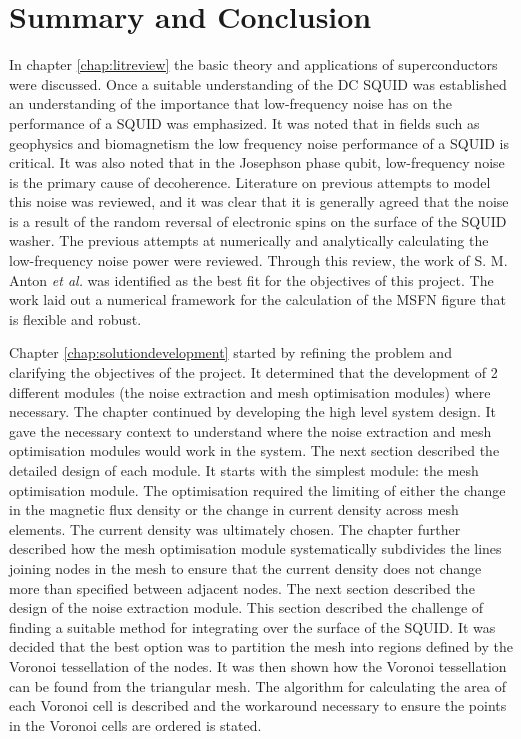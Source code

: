\graphicspath{{conclusion/fig/}}

\chapter{Summary and Conclusion}
\label{chap:conclusion}

In chapter \ref{chap:litreview} the basic theory and applications of superconductors were discussed. Once a suitable understanding of the DC SQUID was established an understanding of the importance that low-frequency noise has on the performance of a SQUID was emphasized. It was noted that in fields such as geophysics and biomagnetism the low frequency noise performance of a SQUID is critical. It was also noted that in the Josephson phase qubit, low-frequency noise is the primary cause of decoherence. Literature on previous attempts to model this noise was reviewed, and it was clear that it is generally agreed that the noise is a result of the random reversal of electronic spins on the surface of the SQUID washer. The previous attempts at numerically and analytically calculating the low-frequency noise power were reviewed. Through this review, the work of S. M. Anton \textit{et al.} was identified as the best fit for the objectives of this project. The work laid out a numerical framework for the calculation of the MSFN figure that is flexible and robust. \par
Chapter \ref{chap:solutiondevelopment} started by refining the problem and clarifying the objectives of the project. It determined that the development of 2 different modules (the noise extraction and mesh optimisation modules) where necessary. The chapter continued by developing the high level system design. It gave the necessary context to understand where the noise extraction and mesh optimisation modules would work in the system. The next section described the detailed design of each module. It starts with the simplest module: the mesh optimisation module. The optimisation required the limiting of either the change in the magnetic flux density or the change in current density across mesh elements. The current density was ultimately chosen. The chapter further described how the mesh optimisation module systematically subdivides the lines joining nodes in the mesh to ensure that the current density does not change more than specified between adjacent nodes. The next section described the design of the noise extraction module. This section described the challenge of finding a suitable method for integrating over the surface of the SQUID. It was decided that the best option was to partition the mesh into regions defined by the Voronoi tessellation of the nodes. It was then shown how the Voronoi tessellation can be found from the triangular mesh. The algorithm for calculating the area of each Voronoi cell is described and the workaround necessary to ensure the points in the Voronoi cells are ordered is stated. 
